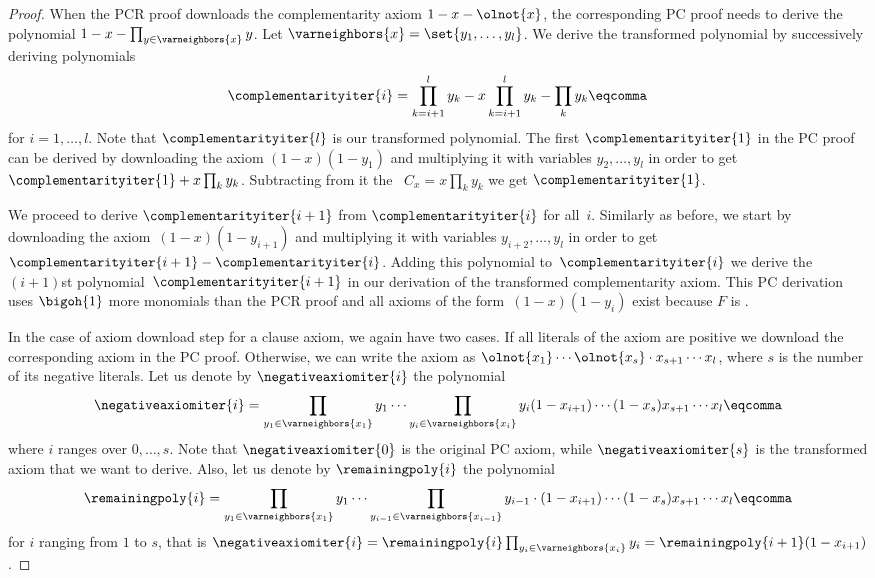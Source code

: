 \documentclass[11pt]{article}
\numberwithin{equation}{section}
\theoremstyle{definition}
\theoremstyle{plain}
\begin{document}
\begin{proof}
  When the PCR proof downloads the complementarity axiom $1 - x -
  \olnot{x}$, the corresponding PC proof needs to derive the
  polynomial $1 - x - \prod_{y \in \varneighbors{x}} y$. Let
  $\varneighbors{x} = \set{y_1, \ldots, y_l}$. We derive the
  transformed polynomial by successively deriving polynomials
  \begin{equation}
    \complementarityiter{i} = \prod_{k = i + 1}^l y_k - x \prod_{k = i + 1}^l y_k - \prod_k y_k \eqcomma
  \end{equation}
  for $i = 1, \ldots, l$. Note that $\complementarityiter{l}$ is our
  transformed polynomial. The first $\complementarityiter{1}$ in the
  PC proof can be derived by downloading the axiom $(1 - x)(1 - y_1)$
  and multiplying it with variables $y_2, \ldots, y_l$ in order to get
  $\complementarityiter{1} + x \prod_k y_k$. Subtracting from it
  the~ $C_x = x \prod_k y_k$ we get
  $\complementarityiter{1}$.


  We proceed to derive $\complementarityiter{i + 1}$ from
  $\complementarityiter{i}$ for all~$i$. Similarly as before, we start
  by downloading the axiom~$(1 - x)(1 - y_{i + 1})$ and multiplying it
  with variables $y_{i + 2}, \ldots, y_l$ in order to get
  $\complementarityiter{i + 1} - \complementarityiter{i}$. Adding this
  polynomial to~$\complementarityiter{i}$ we derive the $(i + 1)$st
  polynomial~$\complementarityiter{i + 1}$ in our derivation of the
  transformed complementarity axiom. This PC derivation uses
  $\bigoh{1}$ more monomials than the PCR proof and all axioms of the
  form~$(1 - x)(1 - y_i)$ exist because $F$ is
  \varweightconstrained{}.

  In the case of axiom download step for a clause axiom, we again have
  two cases. If all literals of the axiom are positive we download the
  corresponding axiom in the PC proof. Otherwise, we can write the
  axiom as $\olnot{x_1} \cdots \olnot{x_s} \cdot x_{s + 1} \cdots
  x_l$, where $s$ is the number of its negative literals.
  Let us denote by $\negativeaxiomiter{i}$
  the polynomial
  \begin{equation}
    \negativeaxiomiter{i} = \prod_{y_1 \in \varneighbors{x_1}} y_1 \cdots \prod_{y_i \in
      \varneighbors{x_i}} y_i (1 - x_{i + 1}) \cdots (1 - x_s) x_{s + 1} \cdots x_l \eqcomma
  \end{equation}
  where $i$ ranges over $0, \ldots, s$. Note that
  $\negativeaxiomiter{0}$ is the original PC axiom, while
  $\negativeaxiomiter{s}$ is the transformed axiom that we want to
  derive. Also, let us denote by $\remainingpoly{i}$ the polynomial
  \begin{equation}
    \remainingpoly{i} = \prod_{y_1 \in \varneighbors{x_1}} y_1 \cdots \prod_{y_{i - 1} \in \varneighbors{x_{i - 1}}} y_{i - 1} \cdot (1 - x_{i + 1}) \cdots (1 - x_s) x_{s + 1} \cdots x_l \eqcomma
  \end{equation}
  for $i$ ranging from $1$ to $s$, that is $\negativeaxiomiter{i} =
  \remainingpoly{i} \prod_{y_i \in \varneighbors{x_i}} y_i =
  \remainingpoly{i + 1} (1 - x_{i + 1})$.


\end{proof}
\end{document}
